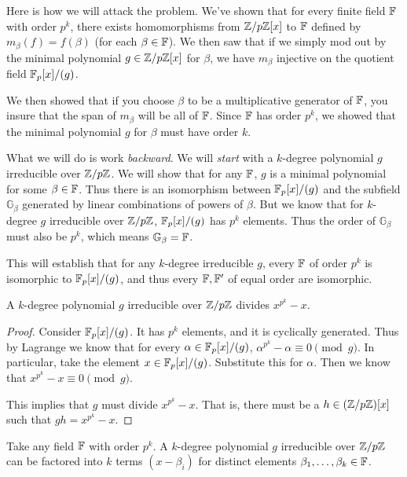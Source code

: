 \begin{remark}
  Here is how we will attack the problem. We've shown that for every
  finite field $\mathbb{F}$ with order $p^k$, there exists homomorphisms from
  $\mathbb{Z} / p\mathbb{Z}[x]$ to $\mathbb{F}$ defined by $m_\beta(f) = f(\beta)$ (for each
  $\beta \in \mathbb{F}$). We then saw that if we simply mod out by the minimal
  polynomial $g \in \mathbb{Z} / p\mathbb{Z}[x]$ for $\beta$, we have $m_\beta$ injective
  on the quotient field $\mathbb{F}_p[x]/(g)$.

  We then showed that if you choose $\beta$ to be a multiplicative
  generator of $\mathbb{F}$, you insure that the span of $m_\beta$ will be all
  of $\mathbb{F}$. Since $\mathbb{F}$ has order $p^k$, we showed that the minimal
  polynomial $g$ for $\beta$ must have order $k$.

  What we will do is work \emph{backward}. We will \emph{start} with a
  $k$-degree polynomial $g$ irreducible over $\mathbb{Z} / p\mathbb{Z}$. We will show that
  for any $\mathbb{F}$, $g$ is a minimal polynomial for some $\beta \in \mathbb{F}$.
  Thus there is an isomorphism between $\mathbb{F}_p[x]/(g)$ and the subfield
  $\mathbb{G}_\beta$ generated by linear combinations of powers of
  $\beta$. But we know that for $k$-degree $g$ irreducible over
  $\mathbb{Z} / p\mathbb{Z}$, $\mathbb{F}_p[x]/(g)$ has $p^k$ elements. Thus the order of
  $\mathbb{G}_\beta$ must also be $p^k$, which means $\mathbb{G}_\beta =
  \mathbb{F}$.

  This will establish that for any $k$-degree irreducible $g$, every
  $\mathbb{F}$ of order $p^k$ is isomorphic to $\mathbb{F}_p[x]/(g)$, and thus every $\mathbb{F},
  \mathbb{F}'$ of equal order are isomorphic.
\end{remark}

\begin{lemma}
  A $k$-degree polynomial $g$ irreducible over $\mathbb{Z} / p\mathbb{Z}$ divides $x^{p^k}
  - x$.
\end{lemma}

\begin{proof}
  Consider $\mathbb{F}_p[x]/(g)$. It has $p^k$ elements, and it is cyclically
  generated. Thus by Lagrange we know that for every $\alpha \in
  \mathbb{F}_p[x]/(g)$, $\alpha^{p^k} - \alpha \equiv 0 \pmod g$. In particular, take
  the element $x \in \mathbb{F}_p[x]/(g)$. Substitute this for $\alpha$. Then we know
  that $x^{p^k} - x \equiv 0 \pmod g$.

  This implies that $g$ must divide $x^{p^k} - x$. That is, there must
  be a $h \in \mathopen{}\left( {\mathbb{Z} / p\mathbb{Z}} \right)\mathclose{}[x]$ such that $gh = x^{p^k} - x$.
\end{proof}

\begin{lemma}
  Take any field $\mathbb{F}$ with order $p^k$. A $k$-degree polynomial $g$
  irreducible over $\mathbb{Z} / p\mathbb{Z}$ can be factored into $k$ terms $(x -
  \beta_i)$ for distinct elements $\beta_1, \ldots, \beta_k \in \mathbb{F}$.
\end{lemma}

